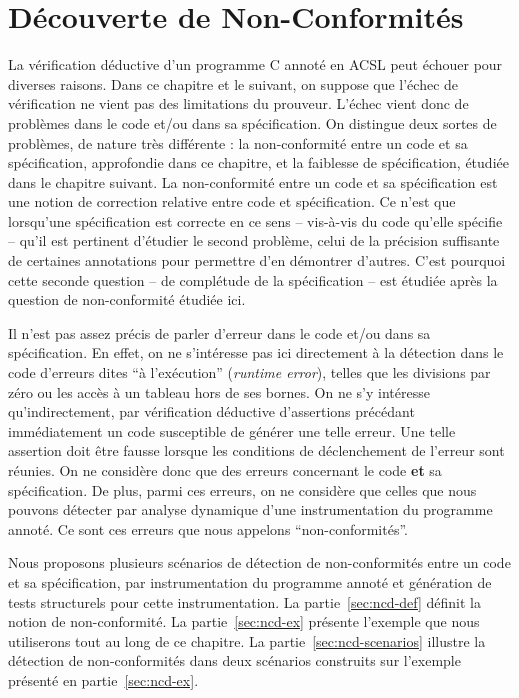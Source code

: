 
\chapter{Découverte de Non-Conformités}
\label{sec:ncd}

\chapterintro



La vérification déductive d'un programme C annoté en ACSL peut échouer pour
diverses raisons. Dans ce chapitre et le suivant, on suppose que l'échec de
vérification ne vient pas des limitations du prouveur. L'échec vient donc de
problèmes dans le code et/ou dans sa spécification. On distingue deux sortes de
problèmes, de nature très différente : la non-conformité entre un code et sa
spécification, approfondie dans ce chapitre, et la faiblesse de spécification,
étudiée dans le chapitre suivant. La non-conformité entre un code et sa
spécification est une notion de correction relative entre code et spécification.
Ce n'est que lorsqu'une spécification est correcte en ce sens -- vis-à-vis du
code qu'elle spécifie -- qu'il est pertinent d'étudier le second problème, celui
de la précision suffisante de certaines annotations pour permettre d'en
démontrer d'autres. C'est pourquoi cette seconde question -- de complétude de la
spécification -- est étudiée après la question de non-conformité étudiée ici.

Il n'est pas assez précis de parler d'erreur dans le code et/ou dans sa
spécification. En effet, on ne s'intéresse pas ici directement à la détection
dans le code d'erreurs dites ``à l'exécution'' (\textit{runtime error}), telles
que les divisions par zéro ou les accès à un tableau hors de ses bornes. On ne
s'y intéresse qu'indirectement, par vérification déductive d'assertions
précédant immédiatement un code susceptible de générer une telle erreur.
Une telle assertion doit être fausse lorsque les conditions de déclenchement de
l'erreur sont réunies. On ne considère donc que des erreurs concernant le code
\textbf{et} sa spécification. De plus, parmi ces erreurs, on ne considère que
celles que nous pouvons détecter par analyse dynamique d'une instrumentation du
programme annoté. Ce sont ces erreurs que nous appelons ``non-conformités''.

Nous proposons plusieurs scénarios de détection de non-conformités entre un code
et sa spécification, par instrumentation du programme annoté et génération de
tests structurels pour cette instrumentation.
La partie~\ref{sec:ncd-def} définit la notion de non-conformité.
La partie~\ref{sec:ncd-ex} présente l'exemple que nous utiliserons tout au long
de ce chapitre.
La partie~\ref{sec:ncd-scenarios} illustre la détection de non-conformités dans
deux scénarios construits sur l'exemple présenté en partie~\ref{sec:ncd-ex}.


